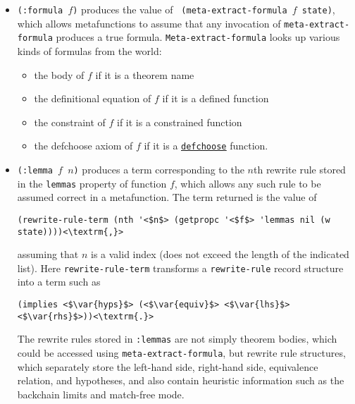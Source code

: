 \begin{itemize}

\item {\tt (:formula $f$)} produces the value of {\tt
    (meta-extract-formula $f$ state)}, which allows metafunctions to
  assume that any invocation of {\tt meta-extract-formula} produces a
  true formula.  {\tt Meta-extract-formula} looks up various kinds of
  formulas from the world:
  \begin{itemize}
  \item the body of $f$ if it is a theorem name
  \item the definitional equation of $f$ if it is a defined function
  \item the constraint of $f$ if it is a constrained function
  \item the defchoose axiom of $f$ if it is a \href{http://www.cs.utexas.edu/users/moore/acl2/manuals/current/manual/index.html?topic=ACL2\_\_\_\_DEFCHOOSE}{\underline{\tt defchoose}} function.
  \end{itemize}


\item {\tt (:lemma $f$ $n$)} produces a term corresponding to the
  $n$th rewrite rule stored in the {\tt lemmas} property of function
  $f$, which allows any such rule to be assumed correct in a
  metafunction.  The term returned is the value of
  \begin{lstlisting}[basicstyle=\linespread{0.4}\normalsize\ttfamily]
    (rewrite-rule-term (nth '<$n$> (getpropc '<$f$> 'lemmas nil (w state))))<\textrm{,}>
  \end{lstlisting}
  assuming that $n$ is a valid index (does not exceed
  the length of the indicated list).  Here {\tt rewrite-\allowbreak{}rule-\allowbreak{}term}
  transforms a {\tt rewrite-rule} record structure into a term such as
  \begin{lstlisting}[basicstyle=\linespread{0.4}\normalsize\ttfamily]
    (implies <$\var{hyps}$> (<$\var{equiv}$> <$\var{lhs}$> <$\var{rhs}$>))<\textrm{.}>
  \end{lstlisting}
  The rewrite rules stored in {\tt :lemmas} are not simply theorem
  bodies, which could be accessed using {\tt meta-extract-formula},
  but rewrite rule structures, which separately store the left-hand
  side, right-hand side, equivalence relation, and hypotheses, and
  also contain heuristic information such as the backchain limits and
  match-free mode.


\end{itemize}
